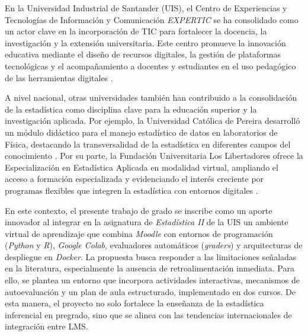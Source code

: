 \documentclass[letter,oneside,12pt,spanish]{report}
\begin{document}
En la Universidad Industrial de Santander (UIS), el Centro de Experiencias y 
Tecnologías de Información y Comunicación \textit{EXPERTIC} se ha consolidado como un actor clave 
en la incorporación de TIC para fortalecer la docencia, la investigación y la extensión universitaria. 
Este centro promueve la innovación educativa mediante el diseño de recursos digitales, la gestión de 
plataformas tecnológicas y el acompañamiento a docentes y estudiantes en el uso pedagógico de las 
herramientas digitales \parencite{UIS2025a}. 

A nivel nacional, otras universidades también han contribuido a la consolidación de la estadística
 como disciplina clave para la educación superior y la investigación aplicada. Por ejemplo, la 
 Universidad Católica de Pereira desarrolló un módulo didáctico para el manejo estadístico de 
 datos en laboratorios de Física, destacando la transversalidad de la estadística en diferentes 
 campos del conocimiento \parencite{ucp2018}. Por su parte, la Fundación Universitaria Los 
 Libertadores ofrece la Especialización en Estadística Aplicada en modalidad virtual, ampliando 
 el acceso a formación especializada y evidenciando el interés creciente por programas flexibles 
 que integren la estadística con entornos digitales \parencite{libertadoressf}.

En este contexto, el presente trabajo de grado se inscribe como un aporte innovador al 
integrar en la asignatura de \textit{Estadística II} de la UIS un ambiente virtual de aprendizaje 
que combina \textit{Moodle} con entornos de programación (\textit{Python} y \textit{R}), 
\textit{Google Colab}, evaluadores automáticos (\textit{graders}) y arquitecturas de despliegue en 
\textit{Docker}. La propuesta busca responder a las limitaciones señaladas en la literatura, 
especialmente la ausencia de retroalimentación inmediata. Para ello, se plantea un entorno que 
incorpora actividades interactivas, mecanismos de autoevaluación y un plan de aula estructurado, 
implementado en dos cursos. De esta manera, el proyecto no solo fortalece la enseñanza de la 
estadística inferencial en pregrado, sino que se alinea con las tendencias internacionales de 
integración entre LMS.

\newpage


%
%

\printbibliography

\nocite{poniszewska-maranda, burns-kubernetes, torres-bosch-microservicios, armstrong2015,kubevirtio, docker2023, kubelet-doc, namespace-article}



\end{document}
